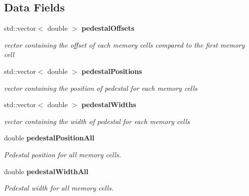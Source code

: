 \subsection*{Data Fields}
\begin{DoxyCompactItemize}
\item 
std\-::vector$<$ double $>$ {\bf pedestal\-Offsets}\label{classCALICE_1_1Ahc2PedestalCalibrator_1_1PedestalSpectrum_a05e78cb9b9717d1ac7c2b905ddc6ab9f}

\begin{DoxyCompactList}\small\item\em vector containing the offset of each memory cells compared to the first memory cell \end{DoxyCompactList}\item 
std\-::vector$<$ double $>$ {\bf pedestal\-Positions}\label{classCALICE_1_1Ahc2PedestalCalibrator_1_1PedestalSpectrum_a86f9afd5754e127d8cd23cd92beef702}

\begin{DoxyCompactList}\small\item\em vector containing the position of pedestal for each memory cells \end{DoxyCompactList}\item 
std\-::vector$<$ double $>$ {\bf pedestal\-Widths}\label{classCALICE_1_1Ahc2PedestalCalibrator_1_1PedestalSpectrum_ab85bc6de877015ebc9a7a50e462573a1}

\begin{DoxyCompactList}\small\item\em vector containing the width of pedestal for each memory cells \end{DoxyCompactList}\item 
double {\bf pedestal\-Position\-All}\label{classCALICE_1_1Ahc2PedestalCalibrator_1_1PedestalSpectrum_a3cd2f8ae912bb2f5945b960a4328c962}

\begin{DoxyCompactList}\small\item\em Pedestal position for all memory cells. \end{DoxyCompactList}\item 
double {\bf pedestal\-Width\-All}\label{classCALICE_1_1Ahc2PedestalCalibrator_1_1PedestalSpectrum_a46ee3c76b98aa250608c7088b5701f1b}

\begin{DoxyCompactList}\small\item\em Pedestal width for all memory cells. \end{DoxyCompactList}\end{DoxyCompactItemize}
